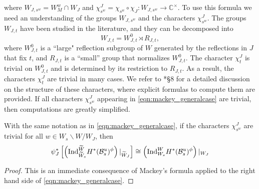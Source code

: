 where $W_{J,s^w}=W_M^w\cap W_J$ and $\chi_{s^w}^J=\chi_{s^w}\circ\chi_J:W_{J,s^w}\rightarrow \mathbb{C}^\times$. To use this formula we need an understanding of the groups $W_{J,s^w}$ and the characters $\chi_{s^w}^J$. The groups $W_{J,t}$ have been studied in the literature, and they can be decomposed into 
$$W_{J,t}=W_{J,t}^0\rtimes R_{J,t},$$
where $W_{J,t}^0$ is a ``large" reflection subgroup of $W$ generated by the reflections in $J$ that fix $t$, and $R_{J,t}$ is a ``small'' group that normalizes $W_{J,t}^0$. The character $\chi_t^J$ is trivial on $W_{J,t}^0$ and is determined by its restriction to $R_{J,t}$. As a result, the characters $\chi_t^J$ are trivial in many cases. 
We refer to \cite{Reeder2000}*{\S 8} for a detailed discussion on the structure of these characters, where explicit formulas to compute them are provided. If all characters $\chi_{s^w}^{J}$ appearing in \eqref{eqn:mackey_generalcase} are trivial, then computations are greatly simplified.
\begin{lemma}\label{lem:mackey_restriction}
    With the same notation as in \eqref{eqn:mackey_generalcase}, if the characters $\chi_{s^w}^{J}$ are trivial for all $w\in W_s\backslash W/W_J$, then
    $$\psi_J^*\left[\left(\mathrm{Ind}_{\widetilde{W}_s}^{\widetilde{W}}H^*(\mathcal{B}^u_s)^\phi\right)|_{\widetilde{W}_J}\right]\cong\left(\mathrm{Ind}_{W_s}^W H^*(\mathcal{B}^u_s)^\phi\right)|_{W_J}$$
\end{lemma}
\begin{proof}
    This is an immediate consequence of Mackey's formula applied to the right hand side of \eqref{eqn:mackey_generalcase}.
\end{proof}
 

